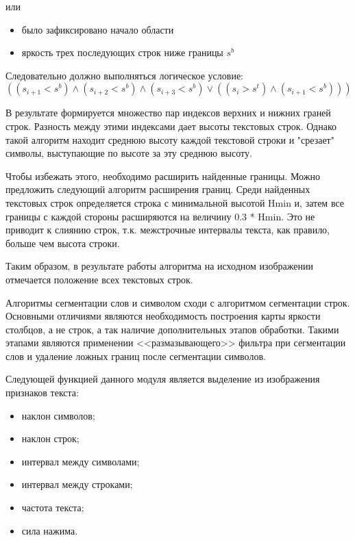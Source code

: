 или

\begin{itemize}
   \item было зафиксировано начало области
   \item яркость трех последующих строк ниже границы $ s^{b} $
\end{itemize}

Следовательно должно выполняться логическое условие:
\begin{displaymath}((s_{i+1} < s^{b}) \wedge (s_{i+2} < s^{b}) \wedge (s_{i+3} < s^{b}) \vee ((s_i > s^{t}) \wedge (s_{i+1} < s^{b})))\end{displaymath}

В результате формируется множество пар индексов верхних и нижних граней строк. Разность между этими индексами дает высоты текстовых строк. Однако такой алгоритм находит среднюю высоту каждой текстовой строки и "срезает" символы, выступающие по высоте за эту среднюю высоту.

Чтобы избежать этого, необходимо расширить найденные границы. Можно предложить следующий алгоритм расширения границ. Среди найденных текстовых строк определяется строка с минимальной высотой Hmin и, затем все границы с каждой стороны расширяются на величину 0.3 * Hmin. Это не приводит к слиянию строк, т.к. межстрочные интервалы текста, как правило, больше чем высота строки.
 
Таким образом, в результате работы алгоритма на исходном изображении отмечается положение всех текстовых строк.  

Алгоритмы сегментации слов и символом сходи с алгоритмом сегментации строк. Основными отличиями являются необходимость построения карты яркости столбцов, а не строк, а так наличие дополнительных этапов обработки. Такими этапами являются применении <<размазывающего>> фильтра при сегментации слов и удаление ложных границ после сегментации символов. 

Следующей функцией данного модуля является выделение из изображения признаков текста:
\begin{itemize}
  \item наклон символов;
  \item наклон строк;
  \item интервал между символами;
  \item интервал между строками;
  \item частота текста;
  \item сила нажима.
\end{itemize}

